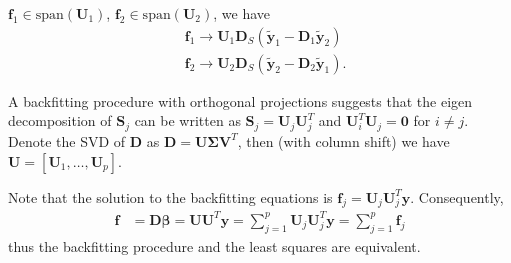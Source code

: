 \begin{exercise}
\begin{exerciseSection}
    $\mathbf{f}_1\in\mbox{span}(\mathbf{U}_1)$, 
    $\mathbf{f}_2\in\mbox{span}(\mathbf{U}_2)$, we have
    \begin{subequations}
      \begin{align}
        & \mathbf{f}_1 \rightarrow \mathbf{U}_1\mathbf{D}_S (\tilde{\mathbf{y}}_1-
        \mathbf{D}_1\tilde{\mathbf{y}}_2)\\
        & \mathbf{f}_2 \rightarrow \mathbf{U}_2\mathbf{D}_S
        (\tilde{\mathbf{y}}_2- \mathbf{D}_2\tilde{\mathbf{y}}_1).
      \end{align}
    \end{subequations}
  \end{exerciseSection}
\end{exercise}

\begin{exercise}
  A backfitting procedure with orthogonal projections suggests that the eigen
  decomposition of $\mathbf{S}_j$ can be written as $\mathbf{S}_j =
  \mathbf{U}_j\mathbf{U}_j^T$ and $\mathbf{U}_i^T\mathbf{U}_j=\mathbf{0}$ for
  $i\not=j$. Denote the SVD of $\mathbf{D}$ as $\mathbf{D} = \mathbf{U\Sigma
  V}^T$, then (with column shift) we have $\mathbf{U} = [\mathbf{U}_1,\ldots,
  \mathbf{U}_p]$.
  
  Note that the solution to the backfitting equations is $\mathbf{f}_j =
  \mathbf{U}_j\mathbf{U}_j^T\mathbf{y}$. Consequently,
  \begin{align}
    \mathbf{f} &= \mathbf{D}\bm{\beta} = \mathbf{UU}^T\mathbf{y} 
    = \sum_{j=1}^p \mathbf{U}_j\mathbf{U}_j^T\mathbf{y} 
    = \sum_{j=1}^p \mathbf{f}_j
  \end{align}
  thus the backfitting procedure and the least squares are equivalent.
\end{exercise}


